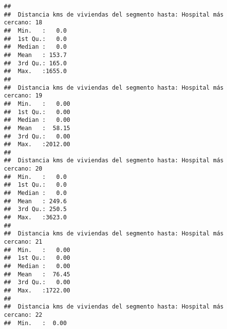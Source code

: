 \documentclass[11pt,]{article}
\begin{document}
\begin{verbatim}
##                                                                         
##  Distancia kms de viviendas del segmento hasta: Hospital más cercano: 18
##  Min.   :   0.0                                                         
##  1st Qu.:   0.0                                                         
##  Median :   0.0                                                         
##  Mean   : 153.7                                                         
##  3rd Qu.: 165.0                                                         
##  Max.   :1655.0                                                         
##                                                                         
##  Distancia kms de viviendas del segmento hasta: Hospital más cercano: 19
##  Min.   :   0.00                                                        
##  1st Qu.:   0.00                                                        
##  Median :   0.00                                                        
##  Mean   :  58.15                                                        
##  3rd Qu.:   0.00                                                        
##  Max.   :2012.00                                                        
##                                                                         
##  Distancia kms de viviendas del segmento hasta: Hospital más cercano: 20
##  Min.   :   0.0                                                         
##  1st Qu.:   0.0                                                         
##  Median :   0.0                                                         
##  Mean   : 249.6                                                         
##  3rd Qu.: 250.5                                                         
##  Max.   :3623.0                                                         
##                                                                         
##  Distancia kms de viviendas del segmento hasta: Hospital más cercano: 21
##  Min.   :   0.00                                                        
##  1st Qu.:   0.00                                                        
##  Median :   0.00                                                        
##  Mean   :  76.45                                                        
##  3rd Qu.:   0.00                                                        
##  Max.   :1722.00                                                        
##                                                                         
##  Distancia kms de viviendas del segmento hasta: Hospital más cercano: 22
##  Min.   :  0.00                                                         

\end{verbatim}
\end{document}
